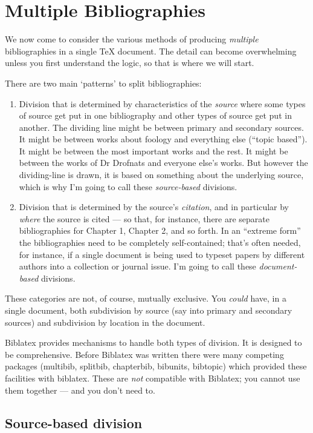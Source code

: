 \chapter{Multiple Bibliographies}

We now come to consider the various methods of producing
\emph{multiple} bibliographies in a single TeX document. The detail
can become overwhelming unless you first understand the logic, so that
is where we will start.

There are two main `patterns' to split bibliographies:

\begin{enumerate}
\item Division that is determined by characteristics of the
  \emph{source} where some types of source get put in one bibliography
  and other types of source get put in another. The dividing line
  might be between primary and secondary sources. It might be between
  works about foology and everything else (``topic based''). It might
  be between the most important works and the rest. It might be
  between the works of Dr Drofnats and everyone else's works. But
  however the dividing-line is drawn, it is based on something about
  the underlying source, which is why I'm going to call these
  \emph{source-based} divisions.
\item Division that is determined by the source's \emph{citation}, and
  in particular by \emph{where} the source is cited --- so that, for
  instance, there are separate bibliographies for Chapter 1, Chapter
  2, and so forth. In an ``extreme form'' the bibliographies need to
  be completely self-contained; that's often needed, for instance, if
  a single document is being used to typeset papers by different
  authors into a collection or journal issue. I'm going to call these
  \emph{document-based} divisions.
\end{enumerate}
These categories are not, of course, mutually exclusive. You
\emph{could} have, in a single document, both subdivision by source
(say into primary and secondary sources) and subdivision by location
in the document.

Biblatex provides mechanisms to handle both types of division. It is
designed to be comprehensive. Before Biblatex was written there were
many competing packages (multibib, splitbib, chapterbib, bibunits,
bibtopic) which provided these facilities with biblatex. These are
\emph{not} compatible with Biblatex; you cannot use them together ---
and you don't need to.

\section{Source-based division}

